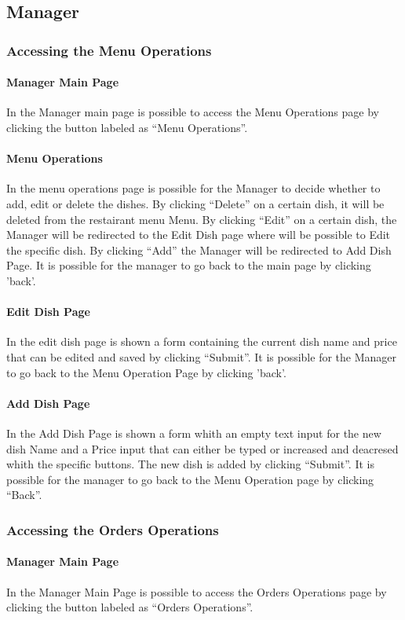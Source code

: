 \subsection{Manager}
\subsubsection{Accessing the Menu Operations}
\paragraph{Manager Main Page}
In the Manager main page is possible to access the Menu Operations page by clicking the button labeled as ``Menu Operations''.

\paragraph{Menu Operations}
In the menu operations page is possible for the Manager to decide whether to add, edit or delete the dishes.
By clicking ``Delete'' on a certain dish, it will be deleted from the restairant menu Menu.
By clicking ``Edit'' on a certain dish, the Manager will be redirected to the Edit Dish page where will be possible to Edit the specific dish.
By clicking ``Add'' the Manager will be redirected to Add Dish Page.
It is possible for the manager to go back to the main page by clicking 'back'.

\paragraph{Edit Dish Page}
In the edit dish page is shown a form containing the current dish name and price that can be edited and saved by clicking ``Submit''.
It is possible for the Manager to go back to the Menu Operation Page by clicking 'back'.

\paragraph{Add Dish Page}
In the Add Dish Page is shown a form whith an empty text input for the new dish Name and a Price input that can either be typed or increased and deacresed whith the specific buttons. The new dish is added by clicking ``Submit''.
It is possible for the manager to go back to the Menu Operation page by clicking ``Back''.

\subsubsection{Accessing the Orders Operations}
\paragraph{Manager Main Page}
In the Manager Main Page is possible to access the Orders Operations page by clicking the button labeled as ``Orders Operations''.
